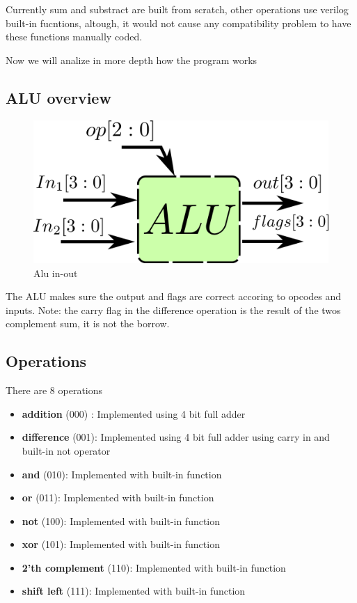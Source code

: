 Currently sum and substract are built from scratch, other operations use verilog built-in fucntions, altough, it would not cause any compatibility problem to have these functions manually coded.

Now we will analize in more depth how the program works

\subsection*{ALU overview}

\begin{figure}[H]
  \begin{centering}
  \includegraphics[scale=1]{data/alu.png}
  \par\end{centering}
  \caption{Alu in-out}
\end{figure}

The ALU makes sure the output and flags are correct accoring to opcodes and inputs. 
Note: the carry flag in the difference operation is the result of the twos complement sum, it is not the borrow.
\subsection*{Operations}
There are 8 operations
\begin{itemize}
  \item \textbf{addition} (000) : Implemented using 4 bit full adder
  \item \textbf{difference} (001): Implemented using 4 bit full adder using carry in and built-in not operator
  \item \textbf{and} (010): Implemented with built-in function
  \item \textbf{or} (011): Implemented with built-in function
  \item \textbf{not} (100): Implemented with built-in function
  \item \textbf{xor} (101): Implemented with built-in function
  \item \textbf{2'th complement} (110): Implemented with built-in function
  \item \textbf{shift left} (111): Implemented with built-in function
\end{itemize}


